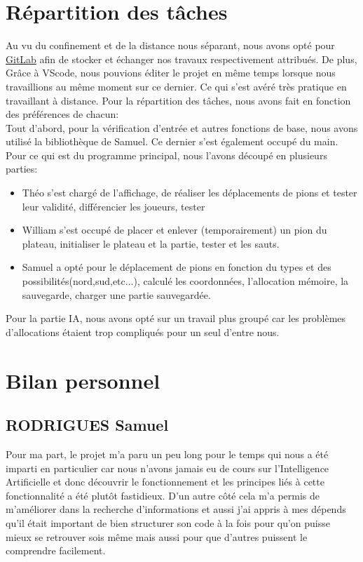 \documentclass{article}
\begin{document}
\section{Répartition des tâches}
    Au vu du confinement et de la distance nous séparant, nous avons opté pour \href{https://gitlab.etude.eisti.fr/rodriguess/jeu-de-traverse}{GitLab} afin de stocker et échanger nos travaux respectivement attribués. De plus, Grâce à VScode, nous pouvions éditer le projet en même temps lorsque nous travaillions au même moment sur ce dernier. Ce qui s'est avéré très pratique en travaillant à distance. Pour la répartition des tâches, nous avons fait en fonction des préférences de chacun: \\
    Tout d'abord, pour la vérification d'entrée et autres fonctions de base, nous avons utilisé la bibliothèque de Samuel. Ce dernier s'est également occupé du main. Pour ce qui est du programme principal, nous l'avons découpé en plusieurs parties:
\begin{itemize}
    \item Théo s'est chargé de l'affichage, de réaliser les déplacements de pions et tester leur validité, différencier les joueurs, tester
    \item William s'est occupé de placer et enlever (temporairement) un pion du plateau, initialiser le plateau et la partie, tester et les sauts.
    \item Samuel a opté pour le déplacement de pions en fonction du types et des possibilités(nord,sud,etc...), calculé les coordonnées, l'allocation mémoire, la sauvegarde, charger une partie sauvegardée.
\end{itemize}
Pour la partie IA, nous avons opté sur un travail plus groupé car les problèmes d'allocations étaient trop compliqués pour un seul d'entre nous.

\section{Bilan personnel}
    \subsection{RODRIGUES Samuel}
    
    Pour ma part, le projet m'a paru un peu long pour le temps qui nous a été imparti en particulier car nous n'avons jamais eu de cours sur l'Intelligence Artificielle et donc découvrir le fonctionnement et les principes liés à cette fonctionnalité a été plutôt fastidieux. D'un autre côté cela m'a permis de m'améliorer dans la recherche d'informations et aussi j'ai appris à mes dépends qu'il était important de bien structurer son code à la fois pour qu'on puisse mieux se retrouver sois même mais aussi pour que d'autres puissent le comprendre facilement.
    
\end{document}
